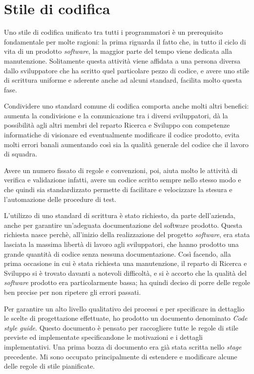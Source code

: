 \section{Stile di codifica}

Uno stile di codifica unificato tra tutti i programmatori è un prerequisito fondamentale per molte ragioni: la prima  riguarda il fatto che, in tutto il ciclo di vita di un prodotto \textit{software}, la maggior parte del tempo viene dedicata alla manutenzione. Solitamente questa attività viene affidata a una persona diversa dallo sviluppatore che ha scritto quel particolare pezzo di codice, e avere uno stile di scrittura uniforme e aderente anche ad alcuni standard, facilita molto questa fase.

Condividere uno standard comune di codifica comporta anche molti altri benefici: aumenta la condivisione e la comunicazione tra i diversi sviluppatori, dà la possibilità agli altri membri del reparto Ricerca e Sviluppo con competenze informatiche di visionare ed eventualmente modificare il codice prodotto, evita molti errori banali aumentando così sia la qualità generale del codice che il lavoro di squadra.

Avere un numero fissato di regole e convenzioni, poi, aiuta molto le attività di verifica e validazione infatti, avere un codice scritto sempre nello stesso modo e che quindi sia standardizzato permette di facilitare e velocizzare la stesura e l'automazione delle procedure di test.

L'utilizzo di uno standard di scrittura è stato richiesto, da parte dell'azienda, anche per garantire un'adeguata documentazione del software prodotto. Questa richiesta nasce perchè, all'inizio della realizzazione del progetto \textit{software}, era stata lasciata la massima libertà di lavoro agli sviluppatori, che hanno prodotto una grande quantità di codice senza nessuna documentazione. Così facendo, alla prima occasione in cui è stata richiesta una manutenzione, il reparto di Ricerca e Sviluppo si è trovato davanti a notevoli difficoltà, e si è accorto che la qualità del \textit{software} prodotto era particolarmente bassa; ha quindi deciso di porre delle regole ben precise per non ripetere gli errori passati.

Per garantire un alto livello qualitativo dei processi e per specificare in dettaglio le scelte di progettazione effettuate, ho prodotto un documento denominato \textit{Code style guide}. Questo documento è pensato per raccogliere tutte le regole di stile previste ed implementate specificandone le motivazioni e i dettagli implementativi. Una prima bozza di documento era già stata scritta nello \textit{stage} precedente. Mi sono occupato principalmente di estendere e modificare alcune delle regole di stile pianificate.

